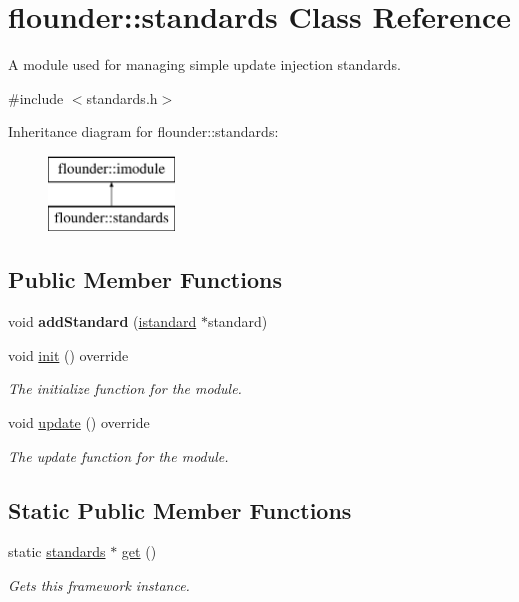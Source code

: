\hypertarget{classflounder_1_1standards}{}\section{flounder\+:\+:standards Class Reference}
\label{classflounder_1_1standards}


A module used for managing simple update injection standards.  




{\ttfamily \#include $<$standards.\+h$>$}

Inheritance diagram for flounder\+:\+:standards\+:\begin{figure}[H]
\begin{center}
\leavevmode
\includegraphics[height=2.000000cm]{classflounder_1_1standards}
\end{center}
\end{figure}
\subsection*{Public Member Functions}
\begin{DoxyCompactItemize}
\item 
\mbox{\label{classflounder_1_1standards_a94f42d8cb4b1d27ee00952cdcd73c367}} 
void {\bfseries add\+Standard} (\hyperlink{classflounder_1_1istandard}{istandard} $\ast$standard)
\item 
void \hyperlink{classflounder_1_1standards_a74dd1bd0e18bc72d985073a0771790fc}{init} () override
\begin{DoxyCompactList}\small\item\em The initialize function for the module. \end{DoxyCompactList}\item 
void \hyperlink{classflounder_1_1standards_a681e682db67c10abb814cf0f8daf086a}{update} () override
\begin{DoxyCompactList}\small\item\em The update function for the module. \end{DoxyCompactList}\end{DoxyCompactItemize}
\subsection*{Static Public Member Functions}
\begin{DoxyCompactItemize}
\item 
static \hyperlink{classflounder_1_1standards}{standards} $\ast$ \hyperlink{classflounder_1_1standards_af31cbc5c0616e052b210cc821ebdd8d5}{get} ()
\begin{DoxyCompactList}\small\item\em Gets this framework instance. \end{DoxyCompactList}\end{DoxyCompactItemize}
